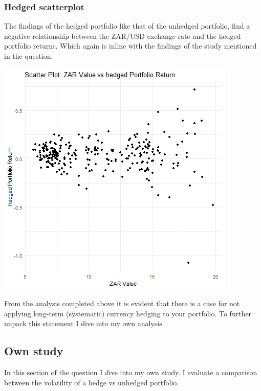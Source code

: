\documentclass[11pt,preprint, authoryear]{elsarticle}
\let\origfigure\figure
\let\endorigfigure\endfigure
\renewenvironment{figure}[1][2] {
    \expandafter\origfigure\expandafter[H]
} {
    \endorigfigure
}
\numberwithin{equation}{section}
\numberwithin{figure}{section}
\numberwithin{table}{section}
\begin{document}
\hypertarget{hedged-scatterplot}{%
\subsubsection{Hedged scatterplot}\label{hedged-scatterplot}}

The findings of the hedged portfolio like that of the unhedged
portfolio, find a negative relationship between the ZAR/USD exchange
rate and the hedged portfolio returns. Which again is inline with the
findings of the study mentioned in the question.

\begin{figure}[H]

{\centering \includegraphics{Question-2_files/figure-latex/Figure 2-1} 

}

\caption{hedged vs ZAR/USD scatter plot \label{Figure2}}\label{fig:Figure 2}
\end{figure}

From the analysis completed above it is evident that there is a case for
not applying long-term (systematic) currency hedging to your portfolio.
To further unpack this statement I dive into my own analysis.

\hypertarget{own-study}{%
\subsection{Own study}\label{own-study}}

In this section of the question I dive into my own study. I evaluate a
comparison between the volatility of a hedge vs unhedged portfolio.
\end{document}
